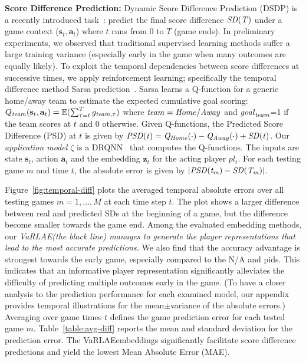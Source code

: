 \documentclass[letterpaper]{article} %
\newcommand{\expect}{\mathbb{E}}
\newcommand{\scorediff}{\it{SD}}
\newcommand{\latentvariables}{\mathbf{z}}
\newcommand{\state}{\mathbf{s}}
\newcommand{\action}{\mathbf{a}}
\newcommand{\goal}{g}
\newcommand{\player}{pl}
\newcommand{\home}{\it{Home}}
\newcommand{\away}{\it{Away}}
\newcommand{\team}{\it{team}}
\newcommand{\egoal}{\it{goal}}
\newcommand{\system}{VaRLAE\;}
\begin{document}
{\bf Score Difference Prediction:}\label{subsec:score-diff}
Dynamic Score Difference Prediction (DSDP) is a recently introduced task~\cite{ganguly2018problem}: 
predict the final score difference $\scorediff(T)$ under a game context ($\state_{t},\action_{t}$) where $t$ runs from 0 to $T$ (game ends). 
In preliminary experiments, we observed that traditional supervised learning methods suffer a large training variance (especially early in the game when many outcomes are equally likely).
To exploit the temporal dependencies between score differences at successive times, we apply reinforcement learning; specifically the temporal difference method Sarsa prediction~\cite{sutton2018reinforcement}. Sarsa learns a Q-function for a generic home/away team to estimate the expected cumulative goal scoring: $Q_{\team}(\state_{t},\action_{t})= \expect(\sum_{\tau=t}^{T}\goal_{\team,\tau})$ where $\team=\home/\away$ and $\egoal_{\team}$=1 if the team scores at $t$ and 0 otherwise. Given Q-functions, the Predicted Score Difference (PSD) at $t$ is given by %
$\it{PSD}(t)= Q_{\home}(\cdot)-Q_{\away}(\cdot) + \scorediff(t)$.
Our {\em application model $\zeta$} is a DRQNN~\cite{littlestone} that computes the Q-functions. The inputs are state $\state_{t}$, action $\action_{t}$ and the embedding $\latentvariables_{t}$ for the acting player $\player_{t}$. 
For each testing game $m$ and time $t$, the absolute error is given by  $ |\it{PSD}(t_m)-\scorediff(T_m)|$. 

Figure~\ref{fig:temporal-diff} plots the averaged temporal absolute errors over all testing games $m=1,\ldots,M$ at each time step $t$.
The plot shows a larger difference between real and predicted SDs at the beginning of a game, but the difference become smaller towards the game end. Among the evaluated embedding methods, our {\em \system (the black line) manages to generate the player representations that lead to the most accurate predictions.} We also find that the accuracy advantage is strongest towards the early game, especially compared to the N/A and pids. This indicates that an informative player representation significantly alleviates the difficulty of predicting multiple outcomes early in the game. (To have a closer analysis to the prediction performance for each examined model, our appendix provides temporal illustrations for the mean$\pm$variance of the absolute errors.) 
Averaging over game times $t$ defines the game prediction error for each tested game $m$. Table~\ref{table:avg-diff} reports the mean and standard deviation for the prediction error.
The \system embeddings significantly facilitate score difference predictions and yield the lowest Mean Absolute Error (MAE).  
\end{document}
